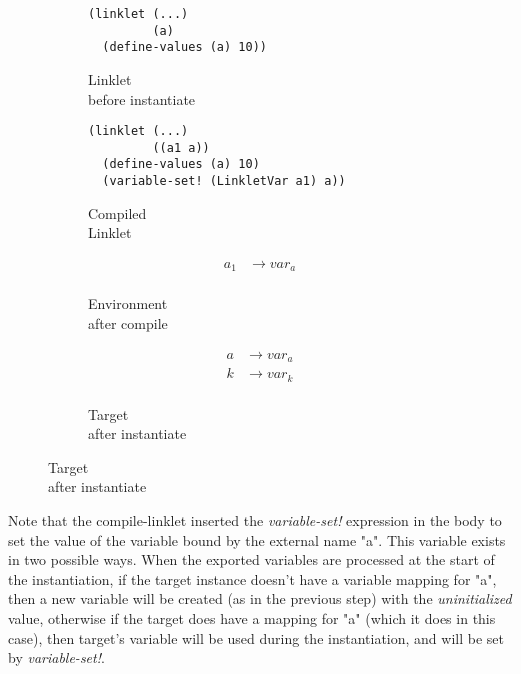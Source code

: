 \begin{figure}[h!]
  \small
  \begin{subfigure}[b]{0.26\textwidth}
    \begin{mdframed}
\begin{verbatim}
(linklet (...)
         (a)
  (define-values (a) 10))
\end{verbatim}
    \end{mdframed}
    \caption{Linklet \\ before instantiate}
    \label{fig:1}
  \end{subfigure}
  \begin{subfigure}[b]{0.38\textwidth}
    \begin{mdframed}
\begin{verbatim}
(linklet (...)
         ((a1 a))
  (define-values (a) 10)
  (variable-set! (LinkletVar a1) a))
\end{verbatim}
    \end{mdframed}
    \caption{Compiled \\ Linklet}
    \label{fig:2}
  \end{subfigure} \hfill
  \begin{subfigure}[b]{0.15\textwidth}
    \begin{mdframed}
      \begin{align*}
        a_1 &\rightarrow var_a \\
      \end{align*}
    \end{mdframed}
    \caption{Environment \\ after compile}
    \label{fig:2}
  \end{subfigure}
  \begin{subfigure}[b]{0.15\textwidth}
    \begin{mdframed}
      \begin{align*}
        a &\rightarrow var_a \\
        k &\rightarrow var_k \\
      \end{align*}
    \end{mdframed}
    \caption{Target \\ after instantiate}
    \label{fig:2}
  \end{subfigure}
\end{figure}

Note that the compile-linklet inserted the \emph{variable-set!}
expression in the body to set the value of the variable bound by the
external name "a". This variable exists in two possible ways. When the
exported variables are processed at the start of the instantiation, if
the target instance doesn't have a variable mapping for "a", then a
new variable will be created (as in the previous step) with the
\emph{uninitialized} value, otherwise if the target does have a
mapping for "a" (which it does in this case), then target's variable
will be used during the instantiation, and will be set by
\emph{variable-set!}.

